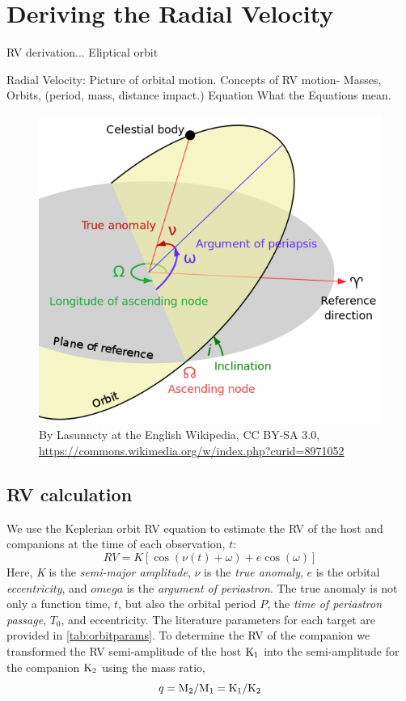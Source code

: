 

\section{Deriving the Radial Velocity}

RV derivation...
Eliptical orbit



Radial Velocity:
Picture of orbital motion.
Concepts of {RV} motion-
Masses,
Orbits, (period, mass, distance impact.)
Equation
What the Equations mean.
\begin{figure}
    \centering
    \includegraphics[width=0.5\linewidth]{figures/advanced_material/orbit}
    \caption{By Lasunncty at the English Wikipedia, CC BY-SA 3.0, \href{https://commons.wikimedia.org/w/index.php?curid=8971052}{https://commons.wikimedia.org/w/index.php?curid=8971052}}
    \label{fig:orbit}
\end{figure}


\subsection{{RV} calculation}
We use the Keplerian orbit {RV} equation to estimate the {RV} of the host and companions at the time of each observation, \(t\):
\begin{equation}
\label{eqn:rv_equation}
{RV} = K [\cos{(\nu(t) + \omega)} + e\cos{(\omega)}]
\end{equation}
Here, \emph{K} is the \emph{semi-major amplitude}, \(\nu\) is the \emph{true anomaly}, \(e\) is the orbital \emph{eccentricity}, and \(omega\) is the \emph{argument of periastron}.
The true anomaly is not only a function time, \(t\), but also the orbital period \(P\), the \emph{time of periastron passage}, \(T_0\), and eccentricity.
The literature parameters for each target are provided in \cref{tab:orbitparams}.
To determine the {RV} of the companion we transformed the {RV} semi-amplitude of the host \(\textrm{K}_{1}\) into the semi-amplitude for the companion \(\textrm{K}_{2}\) using the mass ratio,
\begin{equation}
\label{eqn:mass_ratio}
q = \textrm{M}_{2} / \textrm{M}_{1} = \textrm{K}_{1} / \textrm{K}_{2}
\end{equation}

